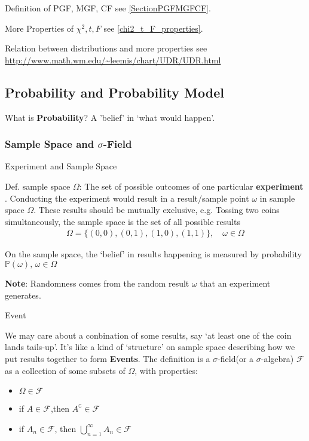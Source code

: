     Definition of PGF, MGF, CF see \autoref{SectionPGFMGFCF}.

    More Properties of $\chi^2,t,F$ see {\autoref{chi2_t_F_properties}}.

    Relation between distributions and more properties see \url{http://www.math.wm.edu/~leemis/chart/UDR/UDR.html}

\subsection{Probability and Probability Model}

    What is \textbf{Probability}? A 'belief' in `what would happen'.


\subsubsection{Sample Space and $\sigma$-Field}

\begin{point}
    Experiment and Sample Space
\end{point}

    Def. sample space $\Omega$: The set of  possible outcomes of one particular \textbf{experiment} . Conducting the experiment would result in a result/sample point $ \omega  $ in sample space $ \Omega  $. These results should be mutually exclusive, e.g. Tossing two coins simultaneously, the sample space is the set of all possible results
    \begin{align}
        \Omega = \{(0,0),(0,1),(1,0),(1,1)\}, \quad \omega \in \Omega 
    \end{align}

    On the sample space, the `belief' in results happening is measured by probability $ \mathbb{P}\left( \omega  \right),\,\omega \in\Omega   $

    \textbf{Note}: Randomness comes from the random result $ \omega  $ that an experiment generates.
    
\begin{point}
    Event 
\end{point}

    We may care about a conbination of some results, say `at least one of the coin lands tails-up'. It's like a kind of `structure' on sample space describing how we put results together to form \textbf{Events}. The definition is  a $\sigma$-field(or a $\sigma$-algebra) $\mathscr{F}$ as a collection of some subsets of $\Omega$, with properties:
    \begin{itemize}[topsep=2pt,itemsep=0pt]
        \item $\Omega\in\mathscr{F}$
        \item if $A\in\mathscr{F}$,then $A^\complement \in\mathscr{F}$
        \item if $A_n\in\mathscr{F}$, then ${\displaystyle\bigcup_{n=1}^\infty} A_n\in\mathscr{F}$
    \end{itemize}


